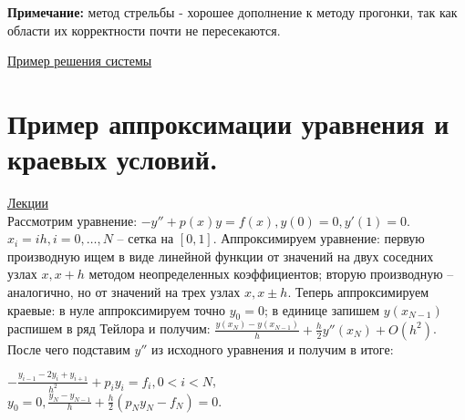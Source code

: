 \documentclass[specialist, subf, href, colorlinks=true, 12pt, times, mtpro, final]{disser}
\theoremstyle{definition}
\begin{document}
{\noindent \textbf{Примечание:} метод стрельбы - хорошее дополнение к методу прогонки, так как области их корректности почти не пересекаются.

\noindent \hyperlink {lects.113}{Пример решения системы}

\section {Пример аппроксимации уравнения и краевых условий.}
    \hyperlink {lects.115}{Лекции}\\
    Рассмотрим уравнение: $-y'' + p(x)y = f(x), y(0) = 0, y'(1) = 0$.\\
    $x_i = ih, i = 0, \dots, N$ -- сетка на $[0,1]$. Аппроксимируем уравнение: первую производную ищем в виде линейной функции от значений на двух соседних узлах $x, x+h$ методом неопределенных коэффициентов; вторую производную -- аналогично, но от значений на трех узлах $x, x\pm h$. Теперь аппроксимируем краевые: в нуле аппроксимируем точно $y_0 = 0$; в единице запишем $y(x_{N-1})$ распишем в ряд Тейлора и получим:
    $\frac{y(x_N)-y(x_{N-1})}{h} + \frac{h}{2}y''(x_N) + O(h^2)$. После чего подставим $y''$ из исходного уравнения и получим в итоге:
    \begin{center}
    	$-\frac{y_{i-1} - 2y_i + y_{i+1}}{h^2} + p_iy_i = f_i, 0 < i < N$,\\
    	$y_0 = 0, \frac{y_N - y_{N-1}}{h} + \frac{h}{2}(p_Ny_N - f_N) = 0$.
    \end{center}

}
\end{document}
